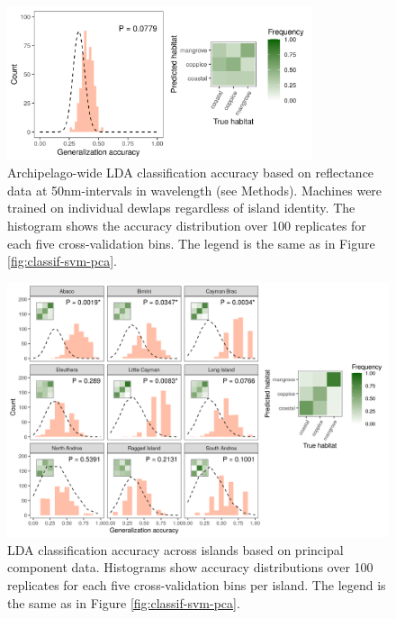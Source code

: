 \begin{figure}[H]
	\centering
	\includegraphics[width=0.8\textwidth]{suppfigures/classif_lda_refl_pooled.png}
	\caption{Archipelago-wide LDA classification accuracy based on reflectance data at 50nm-intervals in wavelength (see Methods). Machines were trained on individual dewlaps regardless of island identity. The histogram shows the accuracy distribution over 100 replicates for each five cross-validation bins. The legend is the same as in Figure \ref{fig:classif-svm-pca}.}
	\label{supfig:classif-lda-refl-pooled}
\end{figure}

\begin{figure}[H]
	\centering
	\includegraphics[width=\textwidth]{suppfigures/classif_lda_pca.png}
	\caption{LDA classification accuracy across islands based on principal component data. Histograms show accuracy distributions over 100 replicates for each five cross-validation bins per island. The legend is the same as in Figure \ref{fig:classif-svm-pca}.}
	\label{supfig:classif-lda-pca}
\end{figure}

